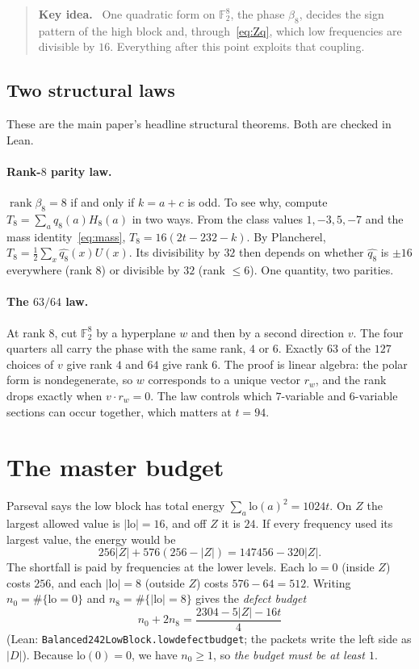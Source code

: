 \documentclass[11pt]{article}
\theoremstyle{definition}
\theoremstyle{remark}
\newcommand{\F}{\mathbb{F}}
\newcommand{\rank}{\operatorname{rank}}
\newcommand{\lo}{\mathrm{lo}}
\newcommand{\code}[1]{\texttt{#1}}
\DeclareRobustCommand{\_}{\textunderscore\allowbreak}
\newenvironment{keyidea}{\begin{quote}\small\textbf{Key idea.}\ }{\end{quote}}
\begin{document}
\begin{keyidea}
One quadratic form on $\F_2^8$, the phase $\beta_8$, decides the sign pattern of the high block and, through~\eqref{eq:Zq}, which low frequencies are divisible by $16$. Everything after this point exploits that coupling.
\end{keyidea}

\subsection{Two structural laws}

These are the main paper's headline structural theorems. Both are checked in Lean.

\paragraph{Rank-$8$ parity law.} $\rank\beta_8=8$ if and only if $k=a+c$ is odd. To see why, compute $T_8=\sum_a q_8(a)H_8(a)$ in two ways. From the class values $1,-3,5,-7$ and the mass identity~\eqref{eq:mass}, $T_8=16(2t-232-k)$. By Plancherel, $T_8=\frac12\sum_x\widehat{q_8}(x)U(x)$. Its divisibility by $32$ then depends on whether $\widehat{q_8}$ is $\pm16$ everywhere (rank $8$) or divisible by $32$ (rank $\le6$). One quantity, two parities.

\paragraph{The $63/64$ law.} At rank $8$, cut $\F_2^8$ by a hyperplane $w$ and then by a second direction $v$. The four quarters all carry the phase with the same rank, $4$ or $6$. Exactly $63$ of the $127$ choices of $v$ give rank $4$ and $64$ give rank $6$. The proof is linear algebra: the polar form is nondegenerate, so $w$ corresponds to a unique vector $r_w$, and the rank drops exactly when $v\cdot r_w=0$. The law controls which $7$-variable and $6$-variable sections can occur together, which matters at $t=94$.

\section{The master budget}
\label{sec:budget}

Parseval says the low block has total energy $\sum_a\lo(a)^2=1024t$. On $Z$ the largest allowed value is $|\lo|=16$, and off $Z$ it is $24$. If every frequency used its largest value, the energy would be
\[
  256|Z|+576(256-|Z|)=147456-320|Z| .
\]
The shortfall is paid by frequencies at the lower levels. Each $\lo=0$ (inside $Z$) costs $256$, and each $|\lo|=8$ (outside $Z$) costs $576-64=512$. Writing $n_0=\#\{\lo=0\}$ and $n_8=\#\{|\lo|=8\}$ gives the \emph{defect budget}
\begin{equation}\label{eq:budget}
  \boxed{\;n_0+2n_8=\frac{2304-5|Z|-16t}{4}\;}
\end{equation}
(Lean: \code{Balanced242LowBlock.low\_defect\_budget}; the packets write the left side as $|D|$). Because $\lo(0)=0$, we have $n_0\ge1$, so \emph{the budget must be at least $1$}.
\end{document}
